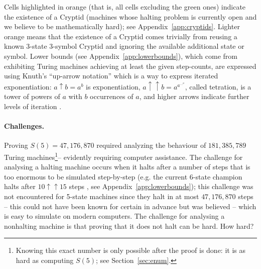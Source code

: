 \documentclass[a4paper,british]{article}
\theoremstyle{definition} %
\numberwithin{equation}{section}
\theoremstyle{definition} %
\newcommand{\BBtheFifth}{47{,}176{,}870}
\newcommand{\BBtheFifthTNF}{181{,}385{,}789}
\begin{document}
\begin{table}[h]
{        Cells highlighted in orange (that is, all cells excluding the green ones) indicate the existence of a Cryptid (\ie machines whose halting problem is currently open and we believe to be mathematically hard); see Appendix~\ref{app:cryptids}. Lighter orange means that the existence of a Cryptid comes trivially from reusing a known 3-state 3-symbol Cryptid and ignoring the available additional state or symbol. Lower bounds (see Appendix~\ref{app:lowerbounds}), which come from exhibiting Turing machines achieving at least the given step-counts, are expressed using Knuth's ``up-arrow notation'' which is a way to express iterated exponentiation:
        $a \uparrow b = a^b$ is exponentiation,
        $a \uparrow\uparrow b = a^{a^{\dots^a}}$, called tetration, is a tower of powers of $a$ with $b$ occurrences of $a$,
        and higher arrows indicate further levels of iteration \cite{Knuth1976Coping}.
    }
    \label{table:landscape}
\end{table}











\paragraph{Challenges.} Proving $S(5) = \BBtheFifth$ required analyzing the behaviour of $\BBtheFifthTNF$ Turing machines\footnote{Knowing this exact number is only possible after the proof is done: it is as hard as computing $S(5)$; see Section~\ref{sec:enum}.}-- evidently requiring computer assistance. The challenge for analysing a halting machine occurs when it halts after a number of steps that is too enormous to be simulated step-by-step (e.g. the current 6-state champion halts after $10 \uparrow \uparrow 15$ steps \cite{Pavel_discorvery}, see Appendix~\ref{app:lowerbounds}); this challenge was not encountered for 5-state machines since they halt in at most $\BBtheFifth$ steps -- this could not have been known for certain in advance but was believed -- which is easy to simulate on modern computers. The challenge for analysing a nonhalting machine is that proving that it does not halt can be hard. How hard?
\end{document}
